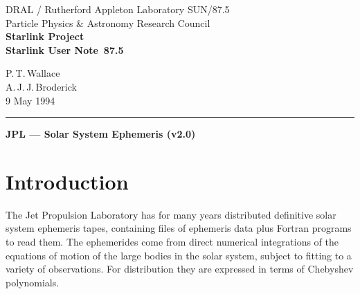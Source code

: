 \pagestyle{myheadings}

\newcommand{\stardoccategory}  {Starlink User Note}
\newcommand{\stardocinitials}  {SUN}
\newcommand{\stardocnumber}    {87.5}
\newcommand{\stardocauthors}   {P.\,T.\,Wallace \\ A.\,J.\,J.\,Broderick}
\newcommand{\stardocdate}      {9 May 1994}
\newcommand{\stardoctitle}     {JPL --- Solar System Ephemeris (v2.0)}

\newcommand{\stardocname}{\stardocinitials /\stardocnumber}
\renewcommand{\_}{{\tt\char'137}}     %
\markright{\stardocname}
\setlength{\textwidth}{160mm}
\setlength{\textheight}{230mm}
\setlength{\topmargin}{-2mm}
\setlength{\oddsidemargin}{0mm}
\setlength{\evensidemargin}{0mm}
\setlength{\parindent}{0mm}
\setlength{\parskip}{\medskipamount}
\setlength{\unitlength}{1mm}



\thispagestyle{empty}
DRAL / {\sc Rutherford Appleton Laboratory} \hfill \stardocname\\
{\large Particle Physics \& Astronomy Research Council}\\
{\large \bf Starlink Project}\\
{\large\bf \stardoccategory\ \stardocnumber}
\begin{flushright}
\stardocauthors\\
\stardocdate
\end{flushright}
\vspace{-4mm}
\rule{\textwidth}{0.5mm}
\vspace{5mm}
\begin{center}
{\Large\bf \stardoctitle}
\end{center}
\vspace{5mm}
\setlength{\parskip}{0mm}
\tableofcontents
\setlength{\parskip}{\medskipamount}
\markright{\stardocname}

\section{Introduction}
The Jet Propulsion Laboratory has for many years distributed
definitive solar system ephemeris tapes,
containing files of ephemeris data plus Fortran programs to read them.
The ephemerides come from direct numerical integrations of the equations
of motion of the large bodies in the solar system, subject to fitting to a
variety of observations.  For distribution they are expressed in
terms of Chebyshev polynomials.

